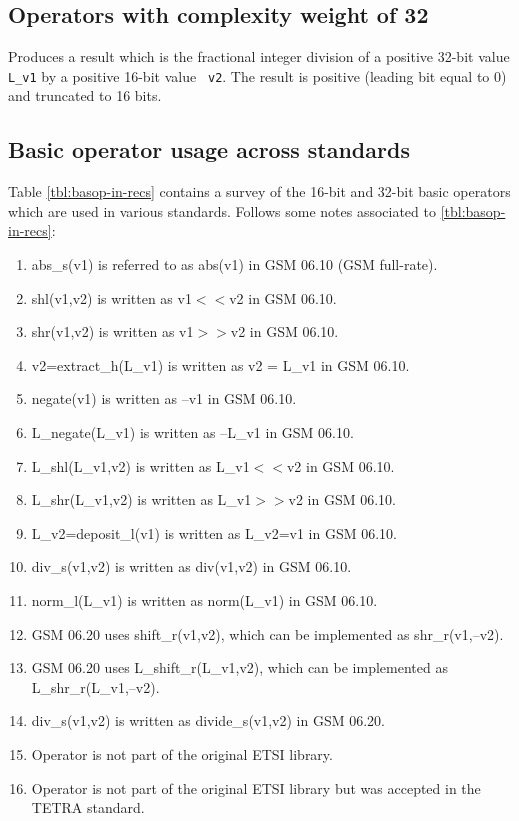 \subsection{Operators with complexity weight of 32}


Produces a result which is the fractional integer division of a
positive 32-bit value {\tt L\_v1} by a positive 16-bit value {\tt
v2}. The result is positive (leading bit equal to 0) and truncated
to 16 bits.

\subsection{Basic operator usage across standards}

Table \ref{tbl:basop-in-recs} contains a survey of the 16-bit and
32-bit basic operators which are used in various standards.
Follows some notes associated to \ref{tbl:basop-in-recs}:

\begin{enumerate}
\item abs\_s(v1) is referred to as abs(v1) in GSM 06.10 (GSM full-rate). 
\item shl(v1,v2) is written as v1$<<$v2 in GSM 06.10. 
\item shr(v1,v2) is written as v1$>>$v2 in GSM 06.10.
\item v2=extract\_h(L\_v1) is written as v2 = L\_v1 in GSM 06.10. 
\item negate(v1) is written as --v1 in GSM 06.10. 
\item L\_negate(L\_v1) is written as --L\_v1 in GSM 06.10. 
\item L\_shl(L\_v1,v2) is written as L\_v1$<<$v2 in GSM 06.10. 
\item L\_shr(L\_v1,v2) is written as L\_v1$>>$v2 in GSM 06.10. 
\item L\_v2=deposit\_l(v1) is written as L\_v2=v1 in GSM 06.10. 
\item div\_s(v1,v2) is written as div(v1,v2) in GSM 06.10. 
\item norm\_l(L\_v1) is written as norm(L\_v1) in GSM 06.10. 
\item GSM 06.20 uses shift\_r(v1,v2), which can be implemented 
        as shr\_r(v1,--v2).
\item GSM 06.20 uses L\_shift\_r(L\_v1,v2), which can be
        implemented as L\_shr\_r(L\_v1,--v2).
\item div\_s(v1,v2) is written as divide\_s(v1,v2) in GSM 06.20.
\item Operator is not part of the original ETSI library. 
\item Operator is not part of the original ETSI library but was
        accepted in the TETRA standard.
\end{enumerate}


